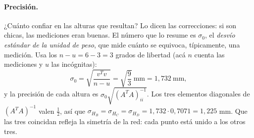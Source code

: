 \paragraph{Precisión.} ¿Cuánto confiar en las alturas que resultan? Lo dicen las
correcciones: si son chicas, las mediciones eran buenas. El número que lo resume es
\(\sigma_0\), el \emph{desvío estándar de la unidad de peso}, que mide cuánto se equivoca,
típicamente, una medición. Usa los \(n-u=6-3=3\) grados
de libertad (acá \(n\) cuenta las mediciones y \(u\) las incógnitas):
\[
  \sigma_0=\sqrt{\frac{v^Tv}{n-u}}=\sqrt{\frac{9}{3}}\ \text{mm}=1{,}732\ \text{mm},
\]
y la precisión de cada altura es \(\sigma_0\sqrt{(A^TA)^{-1}_{ii}}\). Los tres elementos
diagonales de \((A^TA)^{-1}\) valen \(\tfrac12\), así que
\(\sigma_{H_B}=\sigma_{H_C}=\sigma_{H_D}=1{,}732\cdot0{,}7071=1{,}225\) mm. Que las tres
coincidan refleja la simetría de la red: cada punto está unido a los otros tres.

